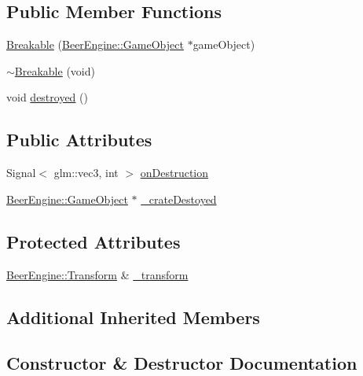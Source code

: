 \subsection*{Public Member Functions}
\begin{DoxyCompactItemize}
\item 
\mbox{\hyperlink{class_game_1_1_component_1_1_breakable_ad739d120313be059576347fd7c691173}{Breakable}} (\mbox{\hyperlink{class_beer_engine_1_1_game_object}{Beer\+Engine\+::\+Game\+Object}} $\ast$game\+Object)
\item 
\mbox{\hyperlink{class_game_1_1_component_1_1_breakable_a865e322dd9c71227b699f85bd492b481}{$\sim$\+Breakable}} (void)
\item 
void \mbox{\hyperlink{class_game_1_1_component_1_1_breakable_a2b58c2c6c0132f8defc9b1e80220530b}{destroyed}} ()
\end{DoxyCompactItemize}
\subsection*{Public Attributes}
\begin{DoxyCompactItemize}
\item 
Signal$<$ glm\+::vec3, int $>$ \mbox{\hyperlink{class_game_1_1_component_1_1_breakable_ac0ae61567c2ac3615929e42bdb0ed735}{on\+Destruction}}
\item 
\mbox{\hyperlink{class_beer_engine_1_1_game_object}{Beer\+Engine\+::\+Game\+Object}} $\ast$ \mbox{\hyperlink{class_game_1_1_component_1_1_breakable_a1bead819f5f60d1bf354b80cf899853f}{\+\_\+crate\+Destoyed}}
\end{DoxyCompactItemize}
\subsection*{Protected Attributes}
\begin{DoxyCompactItemize}
\item 
\mbox{\hyperlink{class_beer_engine_1_1_transform}{Beer\+Engine\+::\+Transform}} \& \mbox{\hyperlink{class_game_1_1_component_1_1_breakable_a97c7499afa143aa9493c206adcb5eee0}{\+\_\+transform}}
\end{DoxyCompactItemize}
\subsection*{Additional Inherited Members}


\subsection{Constructor \& Destructor Documentation}
\mbox{\label{class_game_1_1_component_1_1_breakable_ad739d120313be059576347fd7c691173}} 
